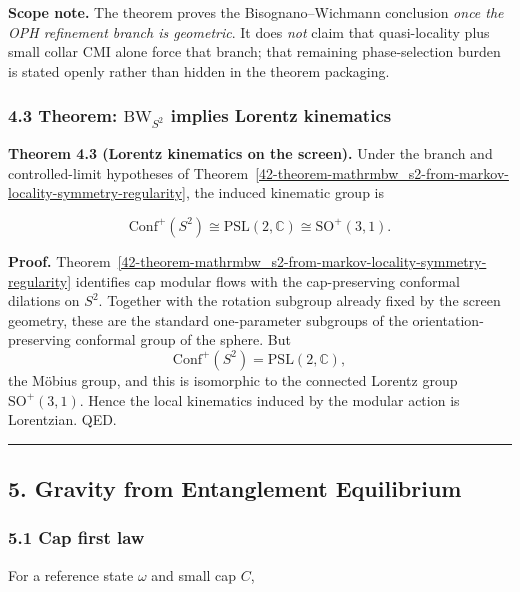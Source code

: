 \textbf{Scope note.} The theorem proves the Bisognano--Wichmann conclusion \emph{once the OPH refinement branch is geometric}. It does \emph{not} claim that quasi-locality plus small collar CMI alone force that branch; that remaining phase-selection burden is stated openly rather than hidden in the theorem packaging.

\subsubsection{\texorpdfstring{4.3 Theorem: \(\mathrm{BW}_{S^2}\) implies Lorentz kinematics}{4.3 Theorem: \textbackslash mathrm\{BW\}\_\{S\^{}2\} implies Lorentz kinematics}}\label{43-theorem-mathrmbw_s2-implies-lorentz-kinematics}

\textbf{Theorem 4.3 (Lorentz kinematics on the screen).} Under the branch and controlled-limit hypotheses of Theorem~\ref{42-theorem-mathrmbw_s2-from-markov-locality-symmetry-regularity}, the induced kinematic group is

\[
\mathrm{Conf}^+(S^2) \cong \mathrm{PSL}(2,\mathbb C) \cong \mathrm{SO}^+(3,1).
\]

\textbf{Proof.} Theorem~\ref{42-theorem-mathrmbw_s2-from-markov-locality-symmetry-regularity} identifies cap modular flows with the cap-preserving conformal dilations on \(S^2\). Together with the rotation subgroup already fixed by the screen geometry, these are the standard one-parameter subgroups of the orientation-preserving conformal group of the sphere. But
\[
\mathrm{Conf}^+(S^2)=\mathrm{PSL}(2,\mathbb C),
\]
the M\"obius group, and this is isomorphic to the connected Lorentz group \(\mathrm{SO}^+(3,1)\). Hence the local kinematics induced by the modular action is Lorentzian. QED.

\begin{center}\rule{0.5\linewidth}{0.5pt}\end{center}

\subsection{5. Gravity from Entanglement Equilibrium}\label{5-gravity-from-entanglement-equilibrium}

\subsubsection{5.1 Cap first law}\label{51-cap-first-law}

For a reference state \(\omega\) and small cap \(C\),

